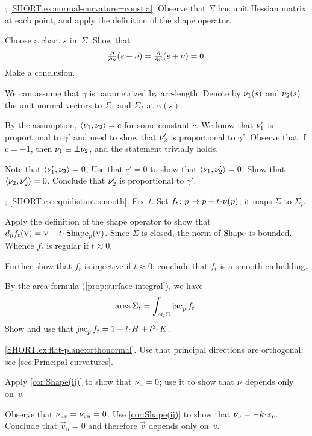 \begin{multicols}{2}
\parbf{\ref{ex:normal-curvature=const}}; \ref{SHORT.ex:normal-curvature=const:a}.
Observe that $\Sigma$ has unit Hessian matrix at each point, and apply the definition of the shape operator.

Choose a chart $s$ in~$\Sigma$.
Show that
\[\tfrac{\partial }{\partial u}(s+\nu)
=
\tfrac{\partial }{\partial v}(s+\nu)
=
0.\]
Make a conclusion.

We can assume that $\gamma$ is parametrized by arc-length.
Denote by $\nu_1(s)$ and $\nu_2(s)$ the unit normal vectors to $\Sigma_1$ and $\Sigma_2$ at $\gamma(s)$.

By the assumption, $\langle \nu_1,\nu_2\rangle= c$ for some constant $c$.
We know that
$\nu_1'$ is proportional to $\gamma'$ and need to show that $\nu_2'$ is proportional to $\gamma'$.
Observe that if $c=\pm1$, then $\nu_1\equiv\pm \nu_2$, and the statement trivially holds.

Note that $\langle\nu_1',\nu_2\rangle=0$;
Use that $c'=0$ to show that $\langle\nu_1,\nu_2'\rangle=0$.
Show that $\langle\nu_2,\nu_2'\rangle=0$.
Conclude that $\nu_2'$ is proportional to $\gamma'$.

\parbf{\ref{ex:equidistant}};
\ref{SHORT.ex:equidistant:smooth}.
Fix~$t$.
Set $f_t\:p\mapsto p+t\cdot\Norm(p)$; it maps $\Sigma$ to $\Sigma_t$.

Apply the definition of the shape operator to show that $d_pf_t(\vec v)=\vec v-t\cdot\Shape_p(\vec v)$.
Since $\Sigma$ is closed, the norm of $\mathop{\rm Shape}\nolimits$ is bounded.
Whence $f_t$ is regular if $t\approx 0$.

Further show that $f_t$ is injective if $t\approx0$;
conclude that $f_t$ is a smooth embedding.

 By the area formula (\ref{prop:surface-integral}), we have
\[\mathop{\rm area}\nolimits\Sigma_t=\int_{p\in \Sigma}\mathop{\rm jac}\nolimits_pf_t.\]
Show and use that $\jac_pf_t=1-t\cdot H+t^2\cdot K$.

\parbf{\ref{ex:flat-plane};} \ref{SHORT.ex:flat-plane:orthonormal}.
Use that principal directions are orthogonal; see \ref{sec:Principal curvatures}.

Apply \ref{cor:Shape(ij)} to show that $\nu_u=0$; use it to show that $\nu$ depends only on~$v$.

Observe that $\nu_{uv}=\nu_{vu}=0$.
Use \ref{cor:Shape(ij)} to show that $\Norm_v=-k \cdot s_v$.
Conclude that $\vec v_u=0$ and therefore $\vec v$ depends only on~$v$.


\end{multicols}
